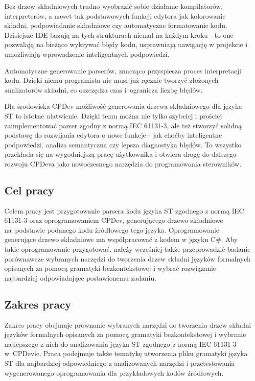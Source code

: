 \documentclass[12pt,twoside]{article}
\begin{document}
Bez drzew składniowych trudno wyobrazić sobie działanie kompilatorów, interpreterów, a nawet tak podstawowych funkcji edytora jak kolorowanie składni, podpowiadanie składniowe czy automatyczne formatowanie kodu. Dzisiejsze IDE bazują na tych strukturach niemal na każdym kroku - to one pozwalają na bieżąco wykrywać błędy kodu, usprawniają nawigację w projekcie i umożliwiają wprowadzenie inteligentnych podpowiedzi.

Automatyczne generowanie parserów, znacząco przyspiesza proces interpretacji kodu. Dzięki niemu programista nie musi już ręcznie tworzyć złożonych analizatorów składni, co oszczędza czas i~ogranicza liczbę błędów.

Dla środowiska CPDev możliwość generowania drzewa składniowego dla języka ST to istotne ułatwienie. Dzięki temu można nie tylko szybciej i prościej zaimplementować parser zgodny z normą IEC 61131-3, ale też stworzyć solidną podstawę do rozwijania edytora o nowe funkcje - jak choćby inteligentne podpowiedzi, analiza semantyczna czy lepsza diagnostyka błędów. To wszystko przekłada się na wygodniejszą pracę użytkownika i otwiera drogę do dalszego rozwoju CPDeva jako nowoczesnego narzędzia do programowania sterowników.

\subsection{Cel pracy}
Celem pracy jest przygotowanie parsera kodu języka ST zgodnego z normą IEC 61131-3 oraz oprogramowaniem CPDev, generującego drzewo składniowe na~podstawie podanego kodu źródłowego tego języka. Oprogramowanie generujące drzewo składniowe ma współpracować z kodem w języku C\#. Aby takie oprogramowanie przygotować, należy wcześniej także przeprowadzić badanie porównawcze wybranych narzędzi do tworzenia drzew składni języków formalnych opisanych za pomocą gramatyki bezkontekstowej i wybrać rozwiązanie najbardziej odpowiadające postawionemu zadaniu.

\subsection{Zakres pracy}
Zakres pracy obejmuje prównanie wybranych narzędzi do tworzenia drzew skła\-dni języków formalnych opisanych za pomocą gramatyki bezkontekstowej i wybranie najlepszego z nich do analizowania języka ST zgodnego z normą IEC 61131-3 w~CPDevie. Praca podejmuje także tematykę utworzenia pliku gramatyki języka ST dla najbardziej odpowiedniego z analizowanych narzędzi i przetestowania wygenerowanego oprogramowania dla przykładowych kodów źródłowych.
\end{document}
